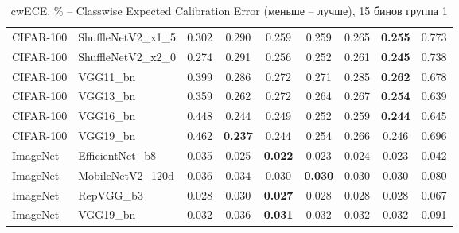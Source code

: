 \begin{table}[h!]
{\begin{tabular}{llccccccc}
CIFAR-100 & ShuffleNetV2\_x1\_5 &         0.302 &                  0.290 &                  0.259 &                  0.259 &                  0.265 & \textbf{0.255} &                  0.773 \\
CIFAR-100 & ShuffleNetV2\_x2\_0 &         0.274 &                  0.291 &                  0.256 &                  0.252 &                  0.261 & \textbf{0.245} &                  0.738 \\
CIFAR-100 &          VGG11\_bn &         0.399 &                  0.286 &                  0.272 &                  0.271 &                  0.285 & \textbf{0.262} &                  0.678 \\
CIFAR-100 &          VGG13\_bn &         0.359 &                  0.262 &                  0.272 &                  0.264 &                  0.267 & \textbf{0.254} &                  0.639 \\
CIFAR-100 &          VGG16\_bn &         0.448 &                  0.244 &                  0.249 &                  0.252 &                  0.259 & \textbf{0.244} &                  0.645 \\
CIFAR-100 &          VGG19\_bn &         0.462 & \textbf{0.237} &                  0.244 &                  0.254 &                  0.266 &                  0.246 &                  0.696 \\
 ImageNet &   EfficientNet\_b8 &         0.035 &                  0.025 & \textbf{0.022} &                  0.023 &                  0.024 &                  0.023 &                  0.042 \\
 ImageNet &  MobileNetV2\_120d &         0.036 &                  0.034 &                  0.030 & \textbf{0.030} &                  0.030 &                  0.030 &                  0.080 \\
 ImageNet &         RepVGG\_b3 &         0.028 &                  0.030 & \textbf{0.027} &                  0.028 &                  0.028 &                  0.028 &                  0.067 \\
 ImageNet &          VGG19\_bn &         0.032 &                  0.036 & \textbf{0.031} &                  0.032 &                  0.032 &                  0.032 &                  0.091 \\
\bottomrule
\end{tabular}%
}
\caption{cwECE, \% -- Classwise Expected Calibration Error (меньше -- лучше), 15 бинов группа 1}
\label{tab:metrics:cwECE_1}
\end{table}
